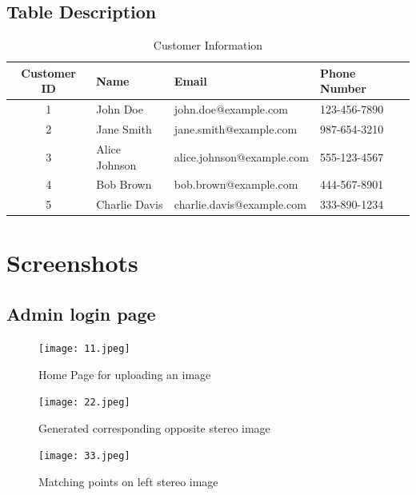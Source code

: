 \documentclass[12pt,a4paper]{report}
\begin{document}
\section{Table Description}

\begin{table}[ht]
\centering
\caption{Customer Information}
\begin{tabular}{|c|l|l|l|}
\hline
\textbf{Customer ID} & \textbf{Name}         & \textbf{Email}              & \textbf{Phone Number} \\ \hline
1                    & John Doe              & john.doe@example.com        & 123-456-7890          \\ \hline
2                    & Jane Smith            & jane.smith@example.com      & 987-654-3210          \\ \hline
3                    & Alice Johnson         & alice.johnson@example.com   & 555-123-4567          \\ \hline
4                    & Bob Brown             & bob.brown@example.com       & 444-567-8901          \\ \hline
5                    & Charlie Davis         & charlie.davis@example.com   & 333-890-1234          \\ \hline
\end{tabular}
\end{table}

\newpage
\chapter{Screenshots}
\section{Admin login page}




\begin{figure}[htp]
\centering
\texttt{[image: 11.jpeg]}
  \caption{Home Page for uploading an image}
  \label{figa1}
\end{figure}

\begin{figure}[htp]
\centering
    \texttt{[image: 22.jpeg]}
  \caption{Generated corresponding opposite stereo image }
  \label{figa2}
\end{figure}

\begin{figure}[htp]
\centering
    \texttt{[image: 33.jpeg]}
  \caption{Matching points on left stereo image}
  \label{figa2}
\end{figure}
\end{document}
